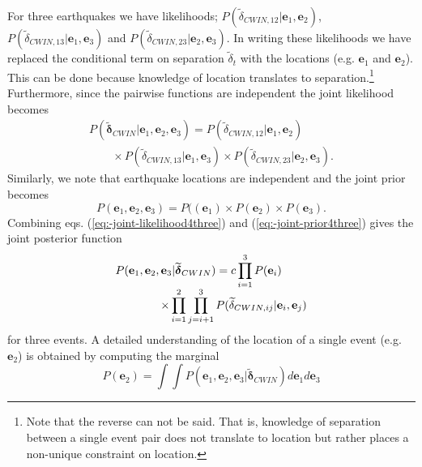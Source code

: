 \documentclass[extra]{gji}
\begin{document}
For three earthquakes we have likelihoods;
$P(\widetilde{\delta}_{CWIN,12}|\mathbf{e}_1, \mathbf{e}_2)$,
$P(\widetilde{\delta}_{CWIN,13}|\mathbf{e}_1, \mathbf{e}_3)$
and
$P(\widetilde{\delta}_{CWIN,23}|\mathbf{e}_2, \mathbf{e}_3)$.
In writing
these likelihoods we have replaced the conditional term on separation
$\widetilde{\delta}_t$ with the locations (e.g. $\mathbf{e}_1$ and $\mathbf{e}_2$).
This can be done because
knowledge of location translates to separation.\footnote{Note that the reverse
can not be said. That is, knowledge of separation between a single event pair
does not translate to location but rather places a non-unique constraint on
location.}
Furthermore, since the pairwise functions are independent the joint
likelihood becomes
\begin{equation}
\begin{array}{l}
\label{eq:-joint-likelihood4three}
P(\widetilde{\mathbf{\delta}}_{CWIN} | \mathbf{e}_1, \mathbf{e}_2, \mathbf{e}_3) =
P(\widetilde{\delta}_{CWIN,12} | \mathbf{e}_1, \mathbf{e}_2) \\
\hspace{2em} \times P(\widetilde{\delta}_{CWIN,13} | \mathbf{e}_1, \mathbf{e}_3)
\times  P(\widetilde{\delta}_{CWIN,23} | \mathbf{e}_2, \mathbf{e}_3).
\end{array}
\end{equation}
Similarly, we note that earthquake locations are independent and the
joint prior becomes
\begin{equation}
\label{eq:-joint-prior4three}
P(\mathbf{e}_1, \mathbf{e}_2, \mathbf{e}_3) = P((\mathbf{e}_1) \times P(\mathbf{e}_2) \times P(\mathbf{e}_3).
\end{equation}
Combining eqs. (\ref{eq:-joint-likelihood4three}) and (\ref{eq:-joint-prior4three})
gives the joint posterior function
\begin{equation}
\label{eq-3eqposterior}
\begin{array}{l}
P(\mathbf{e}_1, \mathbf{e}_2, \mathbf{e}_3 | \widetilde{\mitbf{\delta}}_{CWIN}) = c \displaystyle \prod_{i=1}^3 P(\mathbf{e}_i) \\
\hspace{4em}  \times \displaystyle \prod_{i=1}^2 \prod_{j=i+1}^3 P(\widetilde{\delta}_{CWIN,ij}|\mathbf{e}_i,\mathbf{e}_j)
\end{array}
\end{equation}
for three events. A detailed understanding of the location of a single event (e.g. $\mathbf{e}_2$) is obtained by computing the
marginal
\begin{equation}
\label{eq:-E2-marginal}
P(\mathbf{e}_2) = \int \int P(\mathbf{e}_1, \mathbf{e}_2, \mathbf{e}_3 | \widetilde{\mathbf{\delta}}_{CWIN}) d\mathbf{e}_1 d\mathbf{e}_3
\end{equation}
\end{document}
